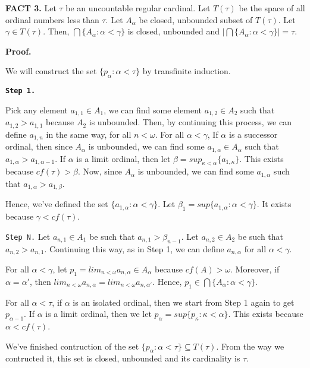 \documentclass{article}
\begin{document}
\textbf{FACT 3.} Let $\tau$ be an uncountable regular cardinal. Let $T(\tau)$ be the space 
of all ordinal numbers less than $\tau$. Let $A_\alpha$ be closed, unbounded subset of $T(\tau)$. Let $\gamma\in T(\tau).$ Then, $\bigcap \{A_\alpha : \alpha<\gamma\}$ is closed, unbounded and $\left| \bigcap \{A_\alpha: \alpha<\gamma\} \right|=\tau$.



\vskip 15pt
\textbf{Proof.} 

We will construct the set $\{p_\alpha: \alpha<\tau\}$ by transfinite induction.

\vskip 10pt
\texttt{\textbf{Step 1.}}

Pick any element $a_{1,1}\in A_1$, we can find some element $a_{1,2}\in A_2$ such that $a_{1,2}>a_{1,1}$ because $A_2$ is unbounded. Then, 
by continuing this process, we can define $a_{1,n}$ in the same way, for all $n<\omega$. 
For all $\alpha<\gamma$,
If $\alpha$ is a successor ordinal, then since $A_\alpha$ is unbounded, we can find some $a_{1,\alpha} \in A_\alpha$ such that $a_{1,\alpha}>a_{1,\alpha-1}$. If $\alpha$ is a limit ordinal, then let $\beta=sup_{\kappa<\alpha} \{a_{1,\kappa}\}$. This exists because $cf(\tau)>\beta$. Now, since $A_\alpha$ is unbounded, we can find some $a_{1,\alpha}$ such that $a_{1,\alpha} >  a_{1,\beta}$.

Hence, we've defined the set $\{a_{1,\alpha}: \alpha <\gamma\}$. Let $\beta_1=sup\{a_{1,\alpha}: \alpha <\gamma\}$. It exists because $\gamma<cf(\tau)$. 

\vskip 10pt

\texttt{Step N.}
Let $a_{n,1}\in A_1$ be such that $a_{n,1} > \beta_{n-1}$. Let $a_{n,2}\in A_2$ be such that $a_{n,2} > a_{n,1}$. Continuing this way, as in Step 1, we can 
define $a_{n,\alpha}$ for all $\alpha<\gamma$. 
\vskip 10pt


For all $\alpha<\gamma$, let $p_1= lim_{n<\omega} a_{n,\alpha} \in A_\alpha$ because $cf(A)>\omega$. Moreover, if $\alpha =\alpha'$, then $lim_{n<\omega} a_{n,\alpha}= lim_{n<\omega} a_{n,\alpha'}$. Hence, $p_1\in \bigcap \{A_\alpha: \alpha<\gamma\}$. 
\vskip 10pt


For all $\alpha <\tau$, if $\alpha$ is an isolated ordinal, then we start from Step 1 again to get $p_{\alpha-1}$. 
If $\alpha$ is a limit ordinal, then we let $p_\alpha= sup \{p_\kappa: \kappa<\alpha\}$. This exists because $\alpha<cf(\tau)$. 

\vskip 10pt

We've finished contruction of the set $\{p_\alpha: \alpha<\tau\}\subseteq T(\tau)$.  From the way we contructed it, this set is closed, unbounded and its cardinality is $\tau$.
\end{document}
